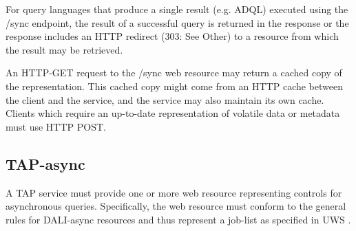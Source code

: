 \documentclass[11pt,letter]{ivoa}
\begin{document}
For query languages that produce a single result (e.g. ADQL) executed using the 
/sync endpoint, the result of a successful query is returned in the response or 
the response includes an HTTP redirect (303: See Other) to a resource from 
which the result may be retrieved.

An HTTP-GET request to the /sync web resource may return a cached copy of the 
representation. This cached copy might come from an HTTP cache between the 
client and the service, and the service may also maintain its own cache. Clients 
which require an up-to-date representation of volatile data or metadata must use 
HTTP POST.

\subsection{TAP-async}
\label{sec:tap-async}

A TAP service must provide one or more web resource representing controls for 
asynchronous queries. Specifically, the web resource must conform to the general rules
for DALI-async resources and thus represent a job-list 
as specified in UWS \citep{2016ivoa.spec.1024H}.
\end{document}
